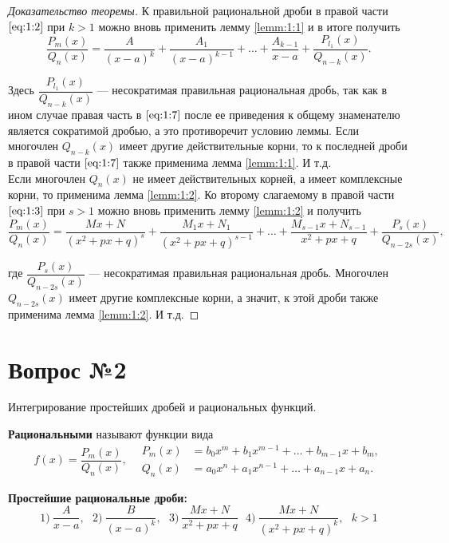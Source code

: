 \documentclass[12pt]{report}
\numberwithin{equation}{section}
\begin{document}
\begin{proof}[Доказательство теоремы]
К правильной рациональной дроби в правой части $\eqref{eq:1:2}$ при $k > 1$ можно вновь применить лемму \ref{lemm:1:1} и в итоге получить
\begin{equation}\label{eq:1:7}
\frac{P_m(x)}{Q_n(x)} = \frac{A}{(x-a)^k} + \frac{A_1}{(x-a)^{k-1}} + \ldots + \frac{A_{k-1}}{x-a} + \frac{P_{l_1}(x)}{Q_{n-k}(x)}.
\end{equation}

Здесь $\dfrac{P_{l_1}(x)}{Q_{n-k}(x)}$ --- несократимая правильная рациональная дробь, так как в ином случае правая часть в $\eqref{eq:1:7}$ после ее приведения к общему знаменателю является сократимой дробью, а это противоречит условию леммы. Если многочлен $Q_{n-k}(x)$ имеет другие действительные корни, то к последней дроби в правой части $\eqref{eq:1:7}$ также применима лемма \ref{lemm:1:1}. И т.д.\\

Если многочлен $Q_n(x)$  не имеет действительных корней, а имеет комплексные корни, то применима лемма \ref{lemm:1:2}. Ко второму слагаемому в правой части $\eqref{eq:1:3}$ при $s > 1$ можно вновь применить лемму \ref{lemm:1:2} и получить
\[ \frac{P_m(x)}{Q_n(x)} = \frac{Mx + N}{(x^2 + px + q)^s} + \frac{M_1x + N_1}{(x^2 + px + q)^{s-1}} + \ldots + \frac{M_{s-1}x + N_{s-1}}{x^2 + px + q} + \frac{P_s(x)}{Q_{n-2s}(x)},\]

где $\dfrac{P_s(x)}{Q_{n-2s} (x)}$ ---  несократимая правильная рациональная дробь. Многочлен $Q_{n-2s}(x)$ имеет другие комплексные корни, а значит, к этой дроби также применима лемма \ref{lemm:1:2}. И т.д.
\end{proof}

\newpage \section{Вопрос №2} %
\begin{framed}Интегрирование простейших дробей и рациональных функций.
\end{framed}
\textbf{Рациональными} называют функции вида
\[f(x) = \frac{P_m(x)}{Q_n(x)},~~~~
\begin{aligned}
P_m(x) &= b_0x^m + b_1 x^{m-1} + \ldots + b_{m-1}x +b_m,\\
Q_n(x) &= a_0 x^n + a_1 x^{n-1} + \ldots + a_{n-1}x + a_n.
 \end{aligned}\]

\textbf{Простейшие рациональные дроби:}
\[ 1)~\frac{A}{x-a},~~~2)~\frac{B}{(x-a)^k},~~~3)~\frac{Mx + N}{x^2 + px + q}~~~4)~\frac{Mx+N}{(x^2 + px + q)^k},~~~k>1\]
\end{document}
